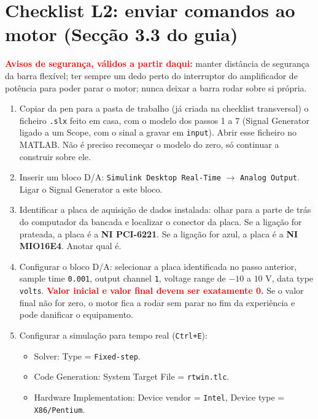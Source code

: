 \documentclass[a4paper,11pt]{article}
\begin{document}
\section*{Checklist L2: enviar comandos ao motor (Secção 3.3 do guia)}

\textcolor{red}{\textbf{Avisos de segurança, válidos a partir daqui:}} manter distância
de segurança da barra flexível; ter sempre um dedo perto do interruptor do
amplificador de potência para poder parar o motor; nunca deixar a barra rodar sobre
si própria.

\begin{enumerate}[label=$\square$, leftmargin=1.5em]
  \item Copiar da pen para a pasta de trabalho (já criada na checklist transversal)
  o ficheiro \texttt{.slx} feito em casa, com o modelo dos passos 1 a 7 (Signal
  Generator ligado a um Scope, com o sinal a gravar em \texttt{input}). Abrir esse
  ficheiro no MATLAB. Não é preciso recomeçar o modelo do zero, só continuar a
  construir sobre ele.

  \item Inserir um bloco D/A: \texttt{Simulink Desktop Real-Time} $\to$
  \texttt{Analog Output}. Ligar o Signal Generator a este bloco.

  \item Identificar a placa de aquisição de dados instalada: olhar para a parte de
  trás do computador da bancada e localizar o conector da placa. Se a ligação for
  prateada, a placa é a \textbf{NI PCI-6221}. Se a ligação for azul, a placa é a
  \textbf{NI MIO16E4}. Anotar qual é.

  \item Configurar o bloco D/A: selecionar a placa identificada no passo anterior,
  sample time \texttt{0.001}, output channel \texttt{1}, voltage range de $-10$ a
  $10$ V, data type \texttt{volts}. \textcolor{red}{\textbf{Valor inicial e valor
  final devem ser exatamente 0.}} Se o valor final não for zero, o motor fica a
  rodar sem parar no fim da experiência e pode danificar o equipamento.

  \item Configurar a simulação para tempo real (\texttt{Ctrl+E}):
  \begin{itemize}
    \item Solver: Type = \texttt{Fixed-step}.
    \item Code Generation: System Target File = \texttt{rtwin.tlc}.
    \item Hardware Implementation: Device vendor = \texttt{Intel}, Device type =
    \texttt{X86/Pentium}.
  \end{itemize}


\end{enumerate}
\end{document}
